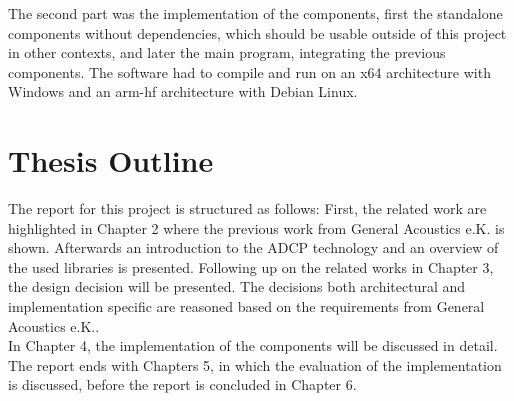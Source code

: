 The second part was the implementation of the components, first the standalone components without dependencies, which should be usable outside of this project in other contexts, and later the main program, integrating the previous components. The software had to compile and run on an x64 architecture with Windows and an arm-hf architecture with Debian Linux.

\section{Thesis Outline}
The report for this project is structured as follows: First, the related work are highlighted in Chapter 2 where the previous work from General Acoustics e.K. is shown. Afterwards an introduction to the ADCP technology and an overview of the used libraries is presented. Following up on the related works in Chapter 3, the design decision will be presented. The decisions both architectural and implementation specific are reasoned based on the requirements from General Acoustics e.K..\\ 
In Chapter 4, the implementation of the components will be discussed in detail. The report ends with Chapters 5, in which the evaluation of the implementation is discussed, before the report is concluded in Chapter 6.
